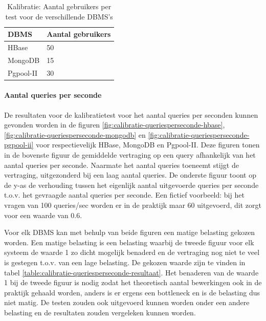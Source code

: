 \begin{table}[ht!]
	\centering
	\begin{tabular}{l| l }
		\textbf{DBMS} & Aantal gebruikers \\
		\hline
		HBase & 50 \\
		MongoDB & 15\\
		Pgpool-II & 30\\
	\end{tabular}
	\caption{Kalibratie: Aantal gebruikers per test voor de verschillende DBMS's}
	\label{table:calibratie-gebruikers-resultaat}
\end{table}

\paragraph{Aantal queries per seconde}
De resultaten voor de kalibratietest voor het aantal queries per seconden kunnen gevonden worden in de figuren \ref{fig:calibratie-queriesperseconde-hbase}, \ref{fig:calibratie-queriesperseconde-mongodb} en \ref{fig:calibratie-queriesperseconde-pgpool-ii} voor respectievelijk HBase, MongoDB en Pgpool-II. Deze figuren tonen in de bovenste figuur de gemiddelde vertraging op een query afhankelijk van het aantal queries per seconde. Naarmate het aantal queries toeneemt stijgt de vertraging, uitgezonderd bij een laag aantal queries. De onderste figuur toont op de y-as de verhouding tussen het eigenlijk aantal uitgevoerde queries per seconde t.o.v. het gevraagde aantal queries per seconde. Een fictief voorbeeld: bij het vragen van 100 queries/sec worden er in de praktijk maar 60 uitgevoerd, dit zorgt voor een waarde van $0.6$. 

Voor elk DBMS kan met behulp van beide figuren een matige belasting gekozen worden. Een matige belasting is een belasting waarbij de tweede figuur voor elk systeem de waarde 1 zo dicht mogelijk benaderd en de vertraging nog niet te veel is gestegen t.o.v. van een lage belasting. De gekozen waarde zijn te vinden in tabel \ref{table:calibratie-queriesperseconde-resultaat}. Het benaderen van de waarde 1 bij de tweede figuur is nodig zodat het theoretisch aantal bewerkingen ook in de praktijk gehaald worden, anders is er ergens een bottleneck en is de belasting dus niet matig. De testen zouden ook uitgevoerd kunnen worden onder een andere belasting en de resultaten zouden vergeleken kunnen worden. 

